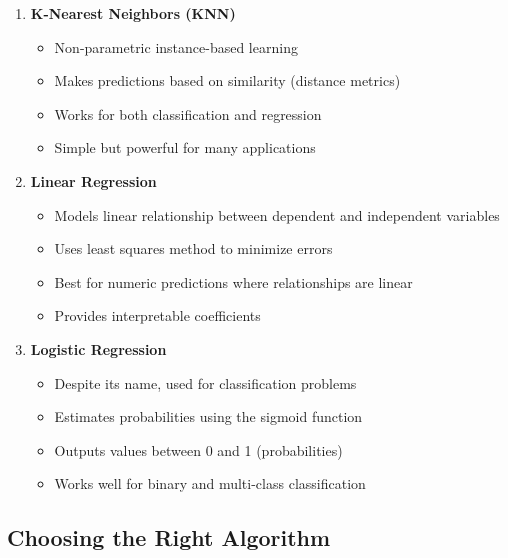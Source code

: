 \documentclass[
  letterpaper,
  DIV=11,
  numbers=noendperiod]{scrreprt}
\providecommand{\tightlist}{%
  \setlength{\itemsep}{0pt}\setlength{\parskip}{0pt}}\usepackage{longtable,booktabs,array}
\begin{document}
\begin{enumerate}
\def\labelenumi{\arabic{enumi}.}
\tightlist
\item
  \textbf{K-Nearest Neighbors (KNN)}

  \begin{itemize}
  \tightlist
  \item
    Non-parametric instance-based learning
  \item
    Makes predictions based on similarity (distance metrics)
  \item
    Works for both classification and regression
  \item
    Simple but powerful for many applications
  \end{itemize}
\item
  \textbf{Linear Regression}

  \begin{itemize}
  \tightlist
  \item
    Models linear relationship between dependent and independent
    variables
  \item
    Uses least squares method to minimize errors
  \item
    Best for numeric predictions where relationships are linear
  \item
    Provides interpretable coefficients
  \end{itemize}
\item
  \textbf{Logistic Regression}

  \begin{itemize}
  \tightlist
  \item
    Despite its name, used for classification problems
  \item
    Estimates probabilities using the sigmoid function
  \item
    Outputs values between 0 and 1 (probabilities)
  \item
    Works well for binary and multi-class classification
  \end{itemize}
\end{enumerate}

\subsection{Choosing the Right
Algorithm}\label{choosing-the-right-algorithm}
\end{document}
